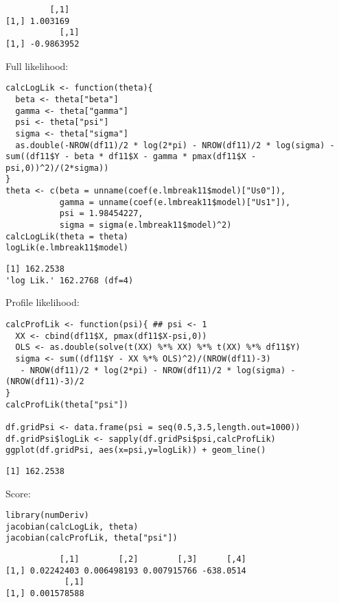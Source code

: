 \documentclass[12pt]{article}
\begin{document}
\begin{verbatim}
         [,1]
[1,] 1.003169
           [,1]
[1,] -0.9863952
\end{verbatim}


Full likelihood:
\lstset{language=r,label= ,caption= ,captionpos=b,numbers=none}
\begin{lstlisting}
calcLogLik <- function(theta){
  beta <- theta["beta"]
  gamma <- theta["gamma"]
  psi <- theta["psi"]
  sigma <- theta["sigma"]
  as.double(-NROW(df11)/2 * log(2*pi) - NROW(df11)/2 * log(sigma) - sum((df11$Y - beta * df11$X - gamma * pmax(df11$X - psi,0))^2)/(2*sigma))
}
theta <- c(beta = unname(coef(e.lmbreak11$model)["Us0"]),
           gamma = unname(coef(e.lmbreak11$model)["Us1"]),
           psi = 1.98454227,
           sigma = sigma(e.lmbreak11$model)^2)
calcLogLik(theta = theta)
logLik(e.lmbreak11$model)
\end{lstlisting}

\begin{verbatim}
[1] 162.2538
'log Lik.' 162.2768 (df=4)
\end{verbatim}


Profile likelihood:
\lstset{language=r,label= ,caption= ,captionpos=b,numbers=none}
\begin{lstlisting}
calcProfLik <- function(psi){ ## psi <- 1
  XX <- cbind(df11$X, pmax(df11$X-psi,0))
  OLS <- as.double(solve(t(XX) %*% XX) %*% t(XX) %*% df11$Y)
  sigma <- sum((df11$Y - XX %*% OLS)^2)/(NROW(df11)-3)
   - NROW(df11)/2 * log(2*pi) - NROW(df11)/2 * log(sigma) - (NROW(df11)-3)/2
}
calcProfLik(theta["psi"])

df.gridPsi <- data.frame(psi = seq(0.5,3.5,length.out=1000))
df.gridPsi$logLik <- sapply(df.gridPsi$psi,calcProfLik)
ggplot(df.gridPsi, aes(x=psi,y=logLik)) + geom_line()
\end{lstlisting}

\begin{verbatim}
[1] 162.2538
\end{verbatim}



Score:
\lstset{language=r,label= ,caption= ,captionpos=b,numbers=none}
\begin{lstlisting}
library(numDeriv)
jacobian(calcLogLik, theta)
jacobian(calcProfLik, theta["psi"])
\end{lstlisting}
\begin{verbatim}
           [,1]        [,2]        [,3]      [,4]
[1,] 0.02242403 0.006498193 0.007915766 -638.0514
            [,1]
[1,] 0.001578588
\end{verbatim}
\end{document}
